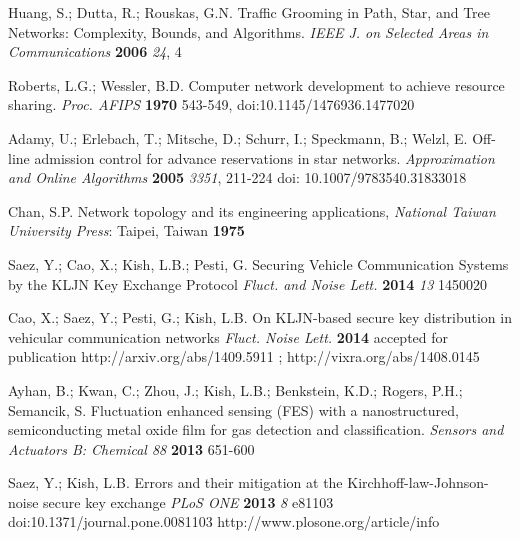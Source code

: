 \documentclass[a4paper,12pt,pdftex]{article}
\begin{document}
\begin{thebibliography}{99}
Huang, S.; Dutta, R.; Rouskas, G.N. Traffic Grooming in Path, Star, and Tree Networks: Complexity, Bounds, and Algorithms. {\em IEEE J. on Selected Areas in Communications} {\bf 2006} {\em 24}, 4

Roberts, L.G.; Wessler, B.D. Computer network development to achieve resource sharing. {\em Proc. AFIPS} {\bf 1970} 543-549, doi:10.1145/1476936.1477020

Adamy, U.; Erlebach, T.; Mitsche, D.; Schurr, I.; Speckmann, B.; Welzl, E. Off-line admission control for advance reservations in star networks. {\em Approximation and Online Algorithms} {\bf 2005} {\em 3351}, 211-224 doi: 10.1007/9783540.31833018

Chan, S.P. Network topology and its engineering applications, {\em National Taiwan University Press}: Taipei, Taiwan {\bf 1975}



Saez, Y.; Cao, X.; Kish, L.B.; Pesti, G. Securing Vehicle Communication Systems by the KLJN Key Exchange Protocol {\em Fluct. and Noise Lett.} {\bf 2014} {\em 13} 1450020

Cao, X.; Saez, Y.; Pesti, G.; Kish, L.B. On KLJN-based secure key distribution in vehicular communication networks {\em Fluct. Noise Lett.} {\bf 2014} accepted for publication http://arxiv.org/abs/1409.5911 ; http://vixra.org/abs/1408.0145



Ayhan, B.; Kwan, C.; Zhou, J.; Kish, L.B.; Benkstein, K.D.; Rogers, P.H.; Semancik, S. Fluctuation enhanced sensing (FES) with a nanostructured, semiconducting metal oxide film for gas detection and classification. {\em Sensors and Actuators B: Chemical 88} {\bf 2013} 651-600 



Saez, Y.; Kish, L.B. Errors and their mitigation at the Kirchhoff-law-Johnson-noise secure key exchange {\em PLoS ONE} {\bf 2013} {\em 8} e81103 doi:10.1371/journal.pone.0081103 http://www.plosone.org/article/info








\end{thebibliography}
\end{document}
